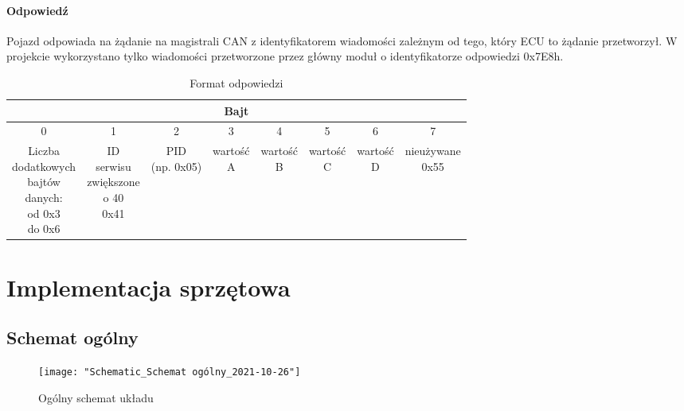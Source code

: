 \documentclass[10pt,a4paper]{article}
\begin{document}
		\paragraph{Odpowiedź}
		Pojazd odpowiada na żądanie na magistrali CAN z identyfikatorem wiadomości zależnym od tego, który ECU to żądanie przetworzył. W projekcie wykorzystano tylko wiadomości przetworzone przez główny moduł o identyfikatorze odpowiedzi 0x7E8h. 
			\begin{table}[H]
			\caption{Format odpowiedzi}
			\begin{center}
				\begin{tabular}{|c|c|c|c|c|c|c|c|}
					\hline
					\multicolumn{8}{|c|}{Bajt}\\
					\hline
					0&1&2&3&4&5&6&7\\
					\hline
					\makecell{Liczba \\dodatkowych \\bajtów \\danych:\\ od 0x3\\do 0x6}&\makecell{ID\\serwisu\\ zwiększone\\ o 40\\ 0x41}&\makecell{PID \\(np. 0x05)}
					&\makecell{wartość\\A}&\makecell{wartość\\ B}&\makecell{wartość\\ C} & \makecell{wartość\\ D} &\makecell{nieużywane\\ 0x55}\\
					\hline
				\end{tabular}
			\end{center}
			\label{tab:odpowiedź}
		\end{table}
	
	\section{Implementacja sprzętowa}
	\subsection{Schemat ogólny}
	\begin{figure}[H]
		\centering
		\texttt{[image: "Schematic\_Schemat ogólny\_2021-10-26"]}
		\caption[Schemat układu]{Ogólny schemat układu}
		\label{fig:schemat_układu}
	\end{figure}
\end{document}

